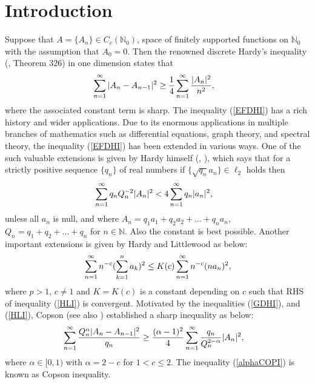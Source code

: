 \documentclass[12pt]{amsart}
\theoremstyle{definition}
\theoremstyle{plain}
\theoremstyle{definition}
\numberwithin{equation}{section}
\begin{document}
\section{Introduction}{\label{secint}}
Suppose that $A=\{A_n\}\in C_{c}(\mathbb{N}_0)$, space of finitely supported functions on $\mathbb{N}_0$ with the assumption that $A_0=0$. Then the renowned discrete Hardy's inequality (\cite{GHYLITTLE}, Theorem 326) in one dimension states that
\begin{align}{\label{EFDHI}}
&\displaystyle\sum_{n=1}^{\infty}|A_n-A_{n-1}|^{2}\geq\frac{1}{4}\displaystyle\sum_{n=1}^{\infty}\frac{|A_n|^{2}}{n^{2}},
\end{align}
where the associated constant term is sharp. The inequality (\ref{EFDHI}) has a rich history and wider applications. Due to its enormous applications in multiple branches of mathematics such as differential equations, graph theory, and spectral theory, the inequality (\ref{EFDHI}) has been extended in various ways. One of the such valuable extensions is given by Hardy himself (\cite{GHYNOTE251}, \cite{GHYNOTE252}), which says that for a strictly positive sequence $\{q_n\}$ of real numbers if $\{\sqrt{q_n}a_{n}\}\in \ell_2$ holds then
\begin{align}{\label{GDHI}}
\displaystyle\sum_{n=1}^{\infty}q_nQ_{n}^{-2}|A_{n}|^{2}&<4\displaystyle\sum_{n=1}^{\infty}q_{n}|a_{n}|^{2},
\end{align} unless all $a_n$ is null, and where $A_{n}=q_{1}a_{1}+ q_{2}a_{2}+ \ldots +q_{n}a_{n}$, $Q_{n}=q_1+q_2+\ldots+q_{n}$ for $n\in \mathbb{N}$. Also the constant is best possible. Another important extensions is given by Hardy and Littlewood \cite{GHYLITTELE} as below:
\begin{align}{\label{HLI}}
\displaystyle\sum_{n=1}^{\infty}n^{-c}(\sum_{k=1}^{n}a_k)^2\leq K(c)\sum_{n=1}^{\infty}n^{-c}(na_n)^2,
\end{align}where $p>1$, $c\neq 1$ and $K=K(c)$ is a constant depending on $c$ such that RHS of inequality (\ref{HLI}) is convergent. Motivated by the inequalities (\ref{GDHI}), and (\ref{HLI}), Copson \cite{ECN2} (see also \cite{ECN}) established a sharp inequality as below:
\begin{align}{\label{alphaCOPI}}
&\displaystyle\sum_{n=1}^{\infty}\frac{Q_{n}^{\alpha}|A_n-A_{n-1}|^{2}}{q_{n}}\geq\frac{(\alpha-1)^2}{4}
\displaystyle\sum_{n=1}^{\infty}\frac{q_{n}}{Q_{n}^{2-\alpha}}|A_{n}|^{2},
\end{align} where $\alpha\in[0,1)$ with $\alpha=2-c$ for $1<c\leq 2$. The inequality (\ref{alphaCOPI}) is known as Copson inequality.\\
\end{document}
